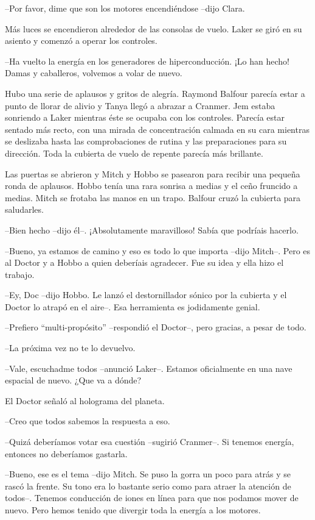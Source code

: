 {--Por favor, dime que son los motores encendiéndose --dijo Clara.}

{Más luces se encendieron alrededor de las consolas de vuelo. Laker se
giró en su asiento y comenzó a operar los controles.}

{--Ha vuelto la energía en los generadores de hiperconducción. ¡Lo han
hecho! Damas y caballeros, volvemos a volar de nuevo.}

{Hubo una serie de aplausos y gritos de alegría. Raymond Balfour parecía
 estar a punto de llorar de alivio y Tanya llegó a abrazar a Cranmer. Jem
 estaba sonriendo a Laker mientras éste se ocupaba con los controles.
 Parecía estar sentado más recto, con una mirada de concentración calmada
 en su cara mientras se deslizaba hasta las comprobaciones de rutina y
 las preparaciones para su dirección. Toda la cubierta de vuelo de
repente parecía más brillante.}

{Las puertas se abrieron y Mitch y Hobbo se pasearon para recibir una
 pequeña ronda de aplausos. Hobbo tenía una rara sonrisa a medias y el
 ceño fruncido a medias. Mitch se frotaba las manos en un trapo. Balfour
cruzó la cubierta para saludarles.}

{--Bien hecho --dijo él--. ¡Absolutamente maravilloso! Sabía que podríais
hacerlo.}

{--Bueno, ya estamos de camino y eso es todo lo que importa --dijo
 Mitch--. Pero es al Doctor y a Hobbo a quien deberíais agradecer. Fue su
idea y ella hizo el trabajo.}

{--Ey, Doc --dijo Hobbo. Le lanzó el destornillador sónico por la
 cubierta y el Doctor lo atrapó en el aire--. Esa herramienta es
jodidamente genial.}

{--Prefiero ``multi-propósito'' --respondió el Doctor--, pero gracias, a
pesar de todo.}

{--La próxima vez no te lo devuelvo.}

{--Vale, escuchadme todos --anunció Laker--. Estamos oficialmente en una
nave espacial de nuevo. ¿Que va a dónde?}

{El Doctor señaló al holograma del planeta.}

{--Creo que todos sabemos la respuesta a eso.}

{--Quizá deberíamos votar esa cuestión --sugirió Cranmer--. Si tenemos
energía, entonces no deberíamos gastarla.}

{--Bueno, ese es el tema --dijo Mitch. Se puso la gorra un poco para
 atrás y se rascó la frente. Su tono era lo bastante serio como para
 atraer la atención de todos--. Tenemos conducción de iones en línea para
 que nos podamos mover de nuevo. Pero hemos tenido que divergir toda la
energía a los motores.}

